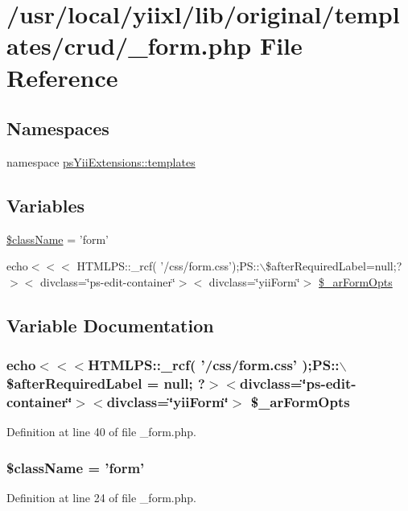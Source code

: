\hypertarget{__form_8php}{
\section{/usr/local/yiixl/lib/original/templates/crud/\_\-form.php File Reference}
\label{__form_8php}
}
\subsection*{Namespaces}
\begin{DoxyCompactItemize}
\item 
namespace \hyperlink{namespacepsYiiExtensions_1_1templates}{psYiiExtensions::templates}
\end{DoxyCompactItemize}
\subsection*{Variables}
\begin{DoxyCompactItemize}
\item 
\hyperlink{__form_8php_acd6a475a6eeb092f4eea3e19e502d67d}{\$className} = 'form'
\item 
echo$<$$<$$<$ HTMLPS::\_\-rcf( '/css/form.css');PS::$\backslash$\$afterRequiredLabel=null;?$>$$<$ divclass=\char`\"{}ps-\/edit-\/container\char`\"{}$>$$<$ divclass=\char`\"{}yiiForm\char`\"{}$>$ \hyperlink{__form_8php_a9db8015e715f53dc0a2f389556437f44}{\$\_\-arFormOpts}
\end{DoxyCompactItemize}


\subsection{Variable Documentation}
\hypertarget{__form_8php_a9db8015e715f53dc0a2f389556437f44}{
\subsubsection[{\$\_\-arFormOpts}]{\setlength{\rightskip}{0pt plus 5cm}echo$<$$<$$<$HTMLPS::\_\-rcf( '/css/form.css' );PS::$\backslash$\$afterRequiredLabel = null; ?$>$$<$divclass=\char`\"{}ps-\/edit-\/container\char`\"{}$>$$<$divclass=\char`\"{}yiiForm\char`\"{}$>$ \$\_\-arFormOpts}}
\label{__form_8php_a9db8015e715f53dc0a2f389556437f44}


Definition at line 40 of file \_\-form.php.

\hypertarget{__form_8php_acd6a475a6eeb092f4eea3e19e502d67d}{
\subsubsection[{\$className}]{\setlength{\rightskip}{0pt plus 5cm}\$className = 'form'}}
\label{__form_8php_acd6a475a6eeb092f4eea3e19e502d67d}


Definition at line 24 of file \_\-form.php.

